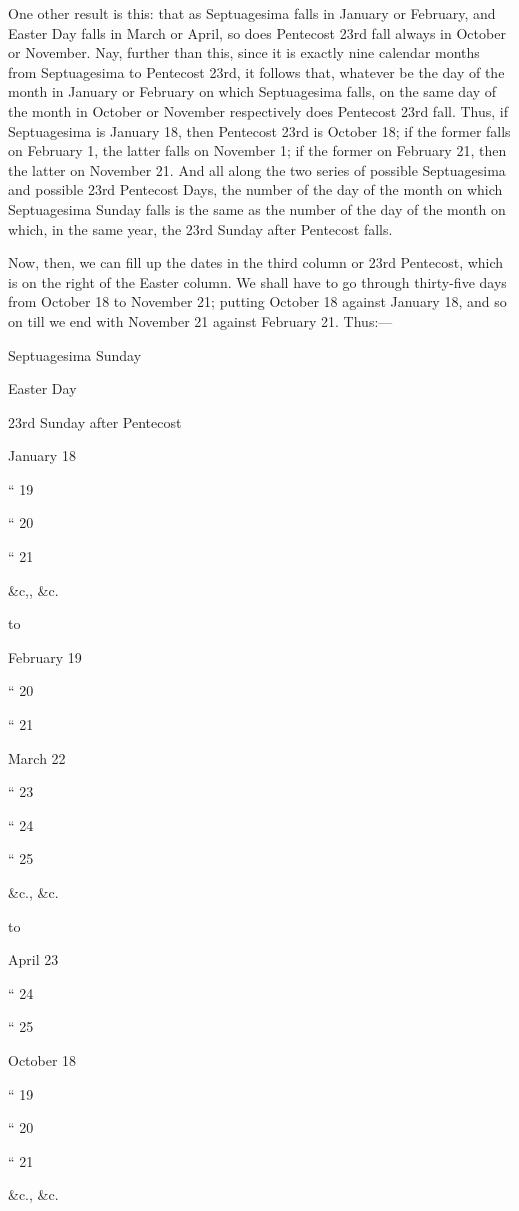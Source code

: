One other result is this: that
as Septuagesima falls in January or February, and Easter Day falls in
March or April, so does Pentecost 23rd fall always in October or
November. Nay, further than this, since it is exactly nine calendar
months from Septuagesima to Pentecost 23rd, it follows that, whatever
be the day of the month in January or February on which Septuagesima
falls, on the same day of the month in October or November
respectively does Pentecost 23rd fall. Thus, if Septuagesima is
January 18, then Pentecost 23rd is October 18; if the former falls on
February 1, the latter falls on November 1; if the former on February
21, then the latter on November 21. And all along the two series of
possible Septuagesima and possible 23rd Pentecost Days, the number of
the day of the month on which Septuagesima Sunday falls is the same as
the number of the day of the month on which, in the same year, the
23rd Sunday after Pentecost falls.

Now, then, we can fill up the
dates in the third column or 23rd Pentecost, which is on the right of
the Easter column. We shall have to go through thirty-five days from
October 18 to November 21; putting October 18 against January 18, and
so on till we end with November 21 against February 21. Thus:—

Septuagesima
Sunday

Easter
Day

23rd
Sunday after Pentecost

January 18

``
19

``
20

``
21

\&c,, \&c.

to

February 19

``
20

``
21

March 22

`` 23

`` 24

`` 25

\&c., \&c.

to 

April 23

`` 24

`` 25

October
18

``
19

``
20

``
21

\&c., \&c.

